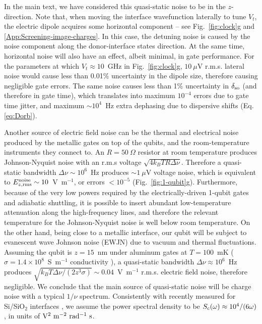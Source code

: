 \documentclass[aps,prb,superscriptaddress,nobibnotes,twocolumn]{revtex4-1}
\begin{document}
In the main text, we have considered this quasi-static noise to be in the $z$-direction. Note that, when moving the interface wavefunction laterally to tune $V_t$, the electric dipole acquires some horizontal component -- see Fig.~\ref{fig:clock}g and \ref{App:Screening-image-charges}. In this case, the detuning noise is caused by the noise component along the donor-interface states direction. At the same time, horizontal noise will also have an effect, albeit minimal, in gate performance. For the parameters at which $V_t\approx 10$~GHz in Fig.~\ref{fig:clock}g, $10~\mu$V r.m.s. lateral noise would cause less than 0.01\% uncertainty in the dipole size, therefore causing negligible gate errors. The same noise causes less than 1\% uncertainty in $\delta_{\rm so}$ (and therefore in gate time), which translates into maximum $10^{-4}$ errors due to gate time jitter, and maximum $\sim10^4$~Hz extra dephasing due to dispersive shifts (Eq. \ref{eq:Dorb}).

Another source of electric field noise can be the thermal and electrical noise produced by the metallic gates on top of the qubits, and the room-temperature instruments they connect to. An $R=50~\Omega$ resistor at room temperature produces Johnson-Nyquist noise with an r.m.s voltage $\sqrt{4k_BTR\Delta\nu}$. Therefore a quasi-static bandwidth $\Delta\nu\sim10^6$~Hz produces $\sim1~\mu$V voltage noise, which is equivalent to $E_{z,\rm rms}^{\rm noise}\sim10$~V~m$^{-1}$, or errors $<10^{-5}$ (Fig.~\ref{fig:1-qubit}g). Furthermore, because of the very low powers required by the electrically-driven 1-qubit gates and adiabatic shuttling, it is possible to insert abundant low-temperature attenuation along the high-frequency lines, and therefore the relevant temperature for the Johnson-Nyquist noise is well below room temperature. On the other hand, being close to a metallic interface, our qubit will be subject to evanescent wave Johnson noise (EWJN) due to vacuum and thermal fluctuations. Assuming the qubit is $z=15$~nm under aluminum gates at $T=100$~mK ($\sigma=1.4\times10^8$~S~m$^{-1}$ conductivity \cite{Dehollain2013S}), a quasi-static bandwidth $\Delta\nu\approx10^6$~Hz produces \cite{Henkel1999S} $\sqrt{k_BT\Delta\nu/(2z^3\sigma)}\sim0.04$~V~m$^{-1}$ r.m.s. electric field noise, therefore negligible. We conclude that the main source of quasi-static noise will be charge noise with a typical $1/\nu$ spectrum. Consistently with recently measured for Si/SiO$_2$ interfaces \cite{Freeman2016S}, we assume the power spectral density to be $S_{\rm c}(\omega)\approx10^4/(6\omega)$, in units of ${\rm V^2~m^{-2}~rad^{-1}~s}$.
\end{document}

